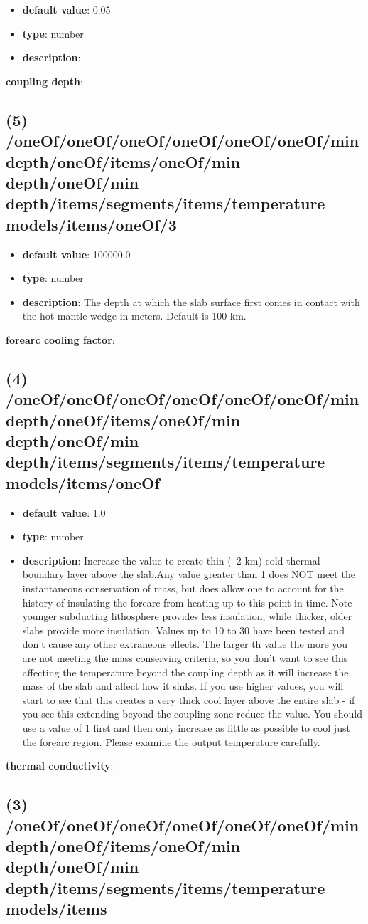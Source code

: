 \begin{itemize}[leftmargin=9em]\item {\bf default value}: 0.05
\item {\bf type}: number
\item {\bf description}: 
\end{itemize}\item {\bf coupling depth}: \subsection{(5) /oneOf/oneOf/oneOf/oneOf/oneOf/oneOf/min depth/oneOf/items/oneOf/min depth/oneOf/min depth/items/segments/items/temperature models/items/oneOf/3}
\begin{itemize}[leftmargin=5em]\item {\bf default value}: 100000.0
\item {\bf type}: number
\item {\bf description}: The depth at which the slab surface first comes in contact with the hot mantle wedge in meters. Default is 100 km.
\end{itemize}\item {\bf forearc cooling factor}: \subsection{(4) /oneOf/oneOf/oneOf/oneOf/oneOf/oneOf/min depth/oneOf/items/oneOf/min depth/oneOf/min depth/items/segments/items/temperature models/items/oneOf}
\begin{itemize}[leftmargin=4em]\item {\bf default value}: 1.0
\item {\bf type}: number
\item {\bf description}: Increase the value to create thin (~2 km) cold thermal boundary layer above the slab.Any value greater than 1 does NOT meet the instantaneous conservation of mass, but does allow one to account for the history of insulating the forearc from heating up to this point in time. Note younger subducting lithosphere provides less insulation, while thicker, older slabs provide more insulation. Values up to 10 to 30 have been tested and don't cause any other extraneous effects. The larger th value the more you are not meeting the mass conserving criteria, so you don't want to see this affecting the temperature beyond the coupling depth as it will increase the mass of the slab and affect how it sinks.  If you use higher values, you will start to see that this creates a very thick cool layer above the entire slab - if you see this extending beyond the coupling zone reduce the value. You should use a value of 1 first and then only increase as little as possible to cool just the forearc region. Please examine the output temperature carefully. 
\end{itemize}\item {\bf thermal conductivity}: \subsection{(3) /oneOf/oneOf/oneOf/oneOf/oneOf/oneOf/min depth/oneOf/items/oneOf/min depth/oneOf/min depth/items/segments/items/temperature models/items}
